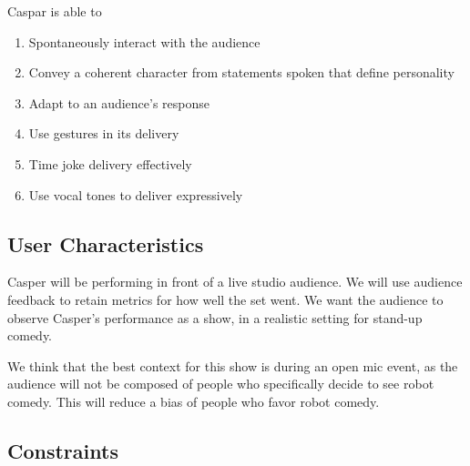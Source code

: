 \documentclass[onecolumn, draftclsnofoot,10pt, compsoc]{IEEEtran}
\begin{document}
Caspar is able to
\begin{enumerate}[\IEEEsetlabelwidth{6)}]
\item Spontaneously interact with the audience
\item Convey a coherent character from statements spoken that define personality
\item Adapt to an audience’s response
\item Use gestures in its delivery
\item Time joke delivery effectively
\item Use vocal tones to deliver expressively



\end{enumerate}



\subsection{User Characteristics}

Casper will be performing in front of a live studio audience. We will use audience feedback to retain metrics for how well the set went. We want the audience to observe Casper’s performance as a show, in a realistic setting for stand-up comedy.

	We think that the best context for this show is during an open mic event, as the audience will not be composed of people who specifically decide to see robot comedy. This will reduce a bias of people who favor robot comedy.



\subsection{Constraints}

\end{document}
